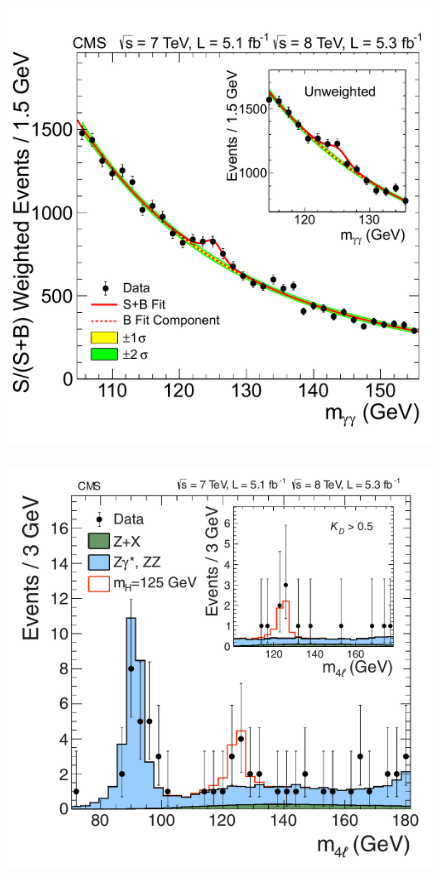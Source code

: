 \begin{figure}[p]
  \centering
  \includegraphics[height=0.29\textheight]{figures/standardmodel/higgs_diphoton}
  ~
  \includegraphics[height=0.28\textheight]{figures/standardmodel/higgs_fourlepton}

\end{figure}
